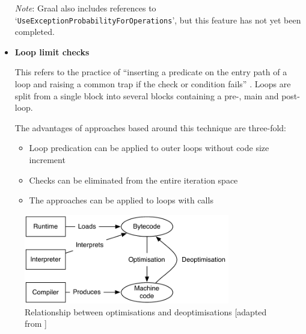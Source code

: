 \begin{itemize}
		{\small\textit{Note}: Graal also includes references to `\texttt{UseExceptionProbabilityForOperations}', but this feature has not yet been completed.}
	
	\item \textbf{Loop limit checks}
	
		This refers to the practice of ``inserting a predicate on the entry path of a loop and raising a common trap if the check or condition fails'' \citep{LoopPrediction}. Loops are split from a single block into several blocks containing a pre-, main and post- loop.
		
		The advantages of approaches based around this technique are three-fold:
		
		\begin{itemize}
			\item Loop predication can be applied to outer loops without code size increment
			
			\item Checks can be eliminated from the entire iteration space
			
			\item The approaches can be applied to loops with calls
		\end{itemize}
\end{itemize}

\begin{figure}
	\centering
	\includegraphics[width=0.8\textwidth]{graphics/jvminternals.pdf}
	\caption{Relationship between optimisations and deoptimisations [adapted from \citealp[p.~24]{Schwaighofer2009}]}
	\label{fig:jvm-internals}
\end{figure}

